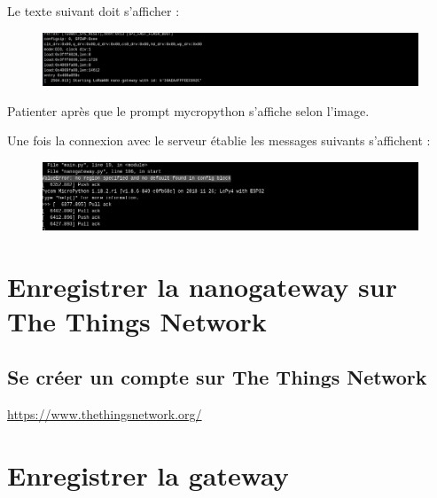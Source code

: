 \documentclass{article}
\begin{document}
Le texte suivant doit s'afficher :

\begin{figure}[H]
\begin{center}
\advance\leftskip-3cm
\advance\rightskip-3cm
\includegraphics[keepaspectratio=true,scale=0.5]{nanogateway_lopy.png}
\label{visina8}
\end{center}\end{figure}


Patienter après que le prompt mycropython s'affiche selon l'image.

Une fois la connexion avec le serveur établie les messages suivants s'affichent :

\begin{figure}[H]
\begin{center}
\advance\leftskip-3cm
\advance\rightskip-3cm
\includegraphics[keepaspectratio=true,scale=0.6]{nano_gateway2.png}
\label{visina8}
\end{center}\end{figure}


\section{Enregistrer la nanogateway sur The Things Network}

\subsection{Se créer un compte sur The Things Network}

\url{https://www.thethingsnetwork.org/}

\section{Enregistrer la gateway}
\end{document}
